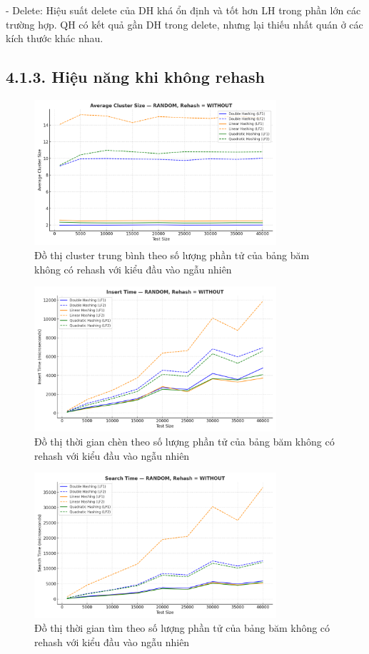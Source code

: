 \documentclass[12pt,a4paper]{report}
\begin{document}
-	Delete: Hiệu suất delete của DH khá ổn định và tốt hơn LH trong phần lớn các trường hợp. QH có kết quả gần DH trong delete, nhưng lại thiếu nhất quán ở các kích thước khác nhau.
\subsection*{4.1.3. Hiệu năng khi không rehash}
\begin{figure}[!ht]
    \centering
    \includegraphics[width=0.8\textwidth]{ran_avr_not.png}
    \caption{Đồ thị cluster trung bình theo số lượng phần tử của bảng băm không có rehash với kiểu đầu vào ngẫu nhiên}
    \label{fig:flowchart}
\end{figure}

\begin{figure}[!ht]
    \centering
    \includegraphics[width=0.8\textwidth]{ran_ser_not.png}
    \caption{Đồ thị thời gian chèn theo số lượng phần tử của bảng băm không có rehash với kiểu đầu vào ngẫu nhiên}
    \label{fig:flowchart}
\end{figure}

\begin{figure}[!ht]
    \centering
    \includegraphics[width=0.8\textwidth]{ran_search_not.png}
    \caption{Đồ thị thời gian tìm theo số lượng phần tử của bảng băm không có rehash với kiểu đầu vào ngẫu nhiên}
    \label{fig:flowchart}
\end{figure}
\end{document}
